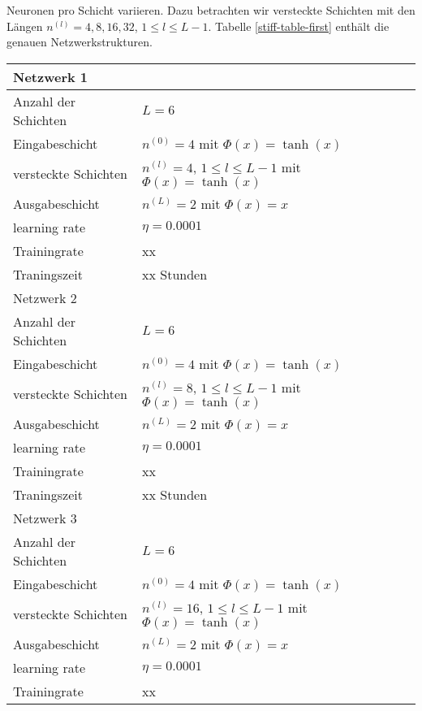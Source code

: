 Neuronen pro Schicht variieren. Dazu betrachten wir versteckte Schichten mit den Längen
$n^{(l)} = 4,8,16,32$, $1 \leq l \leq L-1$. Tabelle \ref{stiff-table-first} enthält die genauen Netzwerkstrukturen.
\begin{table}
       \renewcommand{\arraystretch}{1.0}
       \centering
       \begin{tabular}{ l | l }
              \hline
              Netzwerk 1 & \\
              \hline
              Anzahl der Schichten & $L=6$ \\
              Eingabeschicht & $n^{(0)}=4$ mit $\Phi(x)=\tanh(x)$ \\
              versteckte Schichten & $n^{(l)}=4$, $1\leq l \leq L-1$ mit $\Phi(x)=\tanh(x)$ \\
              Ausgabeschicht & $n^{(L)}=2$ mit $\Phi(x)=x$ \\
              learning rate & $\eta=0.0001$ \\
              Trainingrate & xx \\
              Traningszeit & xx Stunden \\
              \hline
              Netzwerk 2 & \\
              \hline
              Anzahl der Schichten & $L=6$ \\
              Eingabeschicht & $n^{(0)}=4$ mit $\Phi(x)=\tanh(x)$ \\
              versteckte Schichten & $n^{(l)}=8$, $1\leq l \leq L-1$ mit $\Phi(x)=\tanh(x)$ \\
              Ausgabeschicht & $n^{(L)}=2$ mit $\Phi(x)=x$ \\
              learning rate & $\eta=0.0001$ \\
              Trainingrate & xx \\
              Traningszeit & xx Stunden \\
              \hline
              Netzwerk 3 & \\
              \hline
              Anzahl der Schichten & $L=6$ \\
              Eingabeschicht & $n^{(0)}=4$ mit $\Phi(x)=\tanh(x)$ \\
              versteckte Schichten & $n^{(l)}=16$, $1\leq l \leq L-1$ mit $\Phi(x)=\tanh(x)$ \\
              Ausgabeschicht & $n^{(L)}=2$ mit $\Phi(x)=x$ \\
              learning rate & $\eta=0.0001$ \\
              Trainingrate & xx \\

\end{tabular}
\end{table}
